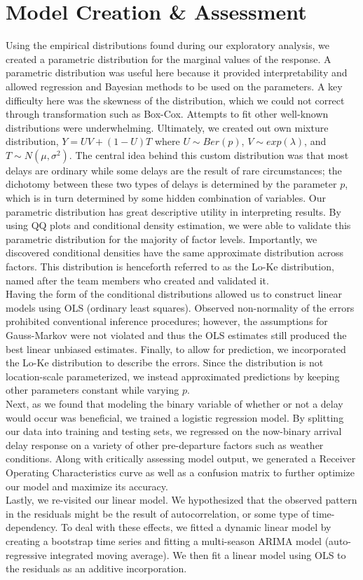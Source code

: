 \documentclass[12pt, a4paper, openany]{book}
\newcommand\tab[1][1cm]{\hspace*{#1}}
\begin{document}
	\section{Model Creation \& Assessment}
\tab Using the empirical distributions found during our exploratory analysis, we created a parametric distribution for the marginal values of the response. A parametric distribution was useful here because it provided interpretability and allowed regression and Bayesian methods to be used on the parameters. A key difficulty here was the skewness of the distribution, which we could not correct through transformation such as Box-Cox. Attempts to fit other well-known distributions were underwhelming. Ultimately, we created out own mixture distribution, $Y = UV+(1-U)T$ where $U\sim Ber(p)$, $V\sim exp(\lambda)$, and $T\sim N(\mu, \sigma^2)$. The central idea behind this custom distribution was that most delays are ordinary while some delays are the result of rare circumstances; the dichotomy between these two types of delays is determined by the parameter $p$, which is in turn determined by some hidden combination of variables. Our parametric distribution has great descriptive utility in interpreting results. By using QQ plots and conditional density estimation, we were able to validate this parametric distribution for the majority of factor levels. Importantly, we discovered conditional densities have the same approximate distribution across factors. This distribution is henceforth referred to as the Lo-Ke distribution, named after the team members who created and validated it. \\
\tab Having the form of the conditional distributions allowed us to construct linear models using OLS (ordinary least squares). Observed non-normality of the errors prohibited conventional inference procedures; however, the assumptions for Gauss-Markov were not violated and thus the OLS estimates still produced the best linear unbiased estimates. Finally, to allow for prediction, we incorporated the Lo-Ke distribution to describe the errors. Since the distribution is not location-scale parameterized, we instead approximated predictions by keeping other parameters constant while varying $p$. \\
\tab Next, as we found that modeling the binary variable of whether or not a delay would occur was beneficial, we trained a logistic regression model. By splitting our data into training and testing sets, we regressed on the now-binary arrival delay response on a variety of other pre-departure factors such as weather conditions. Along with critically assessing model output, we generated a Receiver Operating Characteristics curve as well as a confusion matrix to further optimize our model and maximize its accuracy. \\
\tab Lastly, we re-visited our linear model. We hypothesized that the observed pattern in the residuals might be the result of autocorrelation, or some type of time-dependency. To deal with these effects, we fitted a dynamic linear model by creating a bootstrap time series and fitting a multi-season ARIMA model (auto-regressive integrated moving average). We then fit a linear model using OLS to the residuals as an additive incorporation. 
\end{document}
